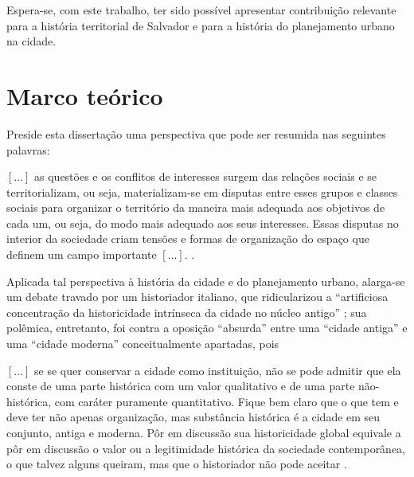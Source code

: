 Espera-se, com este trabalho, ter sido possível apresentar contribuição relevante para a história territorial de Salvador e para a história do planejamento urbano na cidade.

\section[Marco teórico]{Marco teórico}\label{sec:marcteor}

Preside esta dissertação uma perspectiva que pode ser resumida nas seguintes palavras:

\begin{citacao}
\([\dots]\) as questões e os conflitos de interesses surgem das relações sociais e se territorializam, ou seja, materializam-se em disputas entre esses grupos e classes sociais para organizar o território da maneira mais adequada aos objetivos de cada um, ou seja, do modo mais adequado aos seus interesses. Essas disputas no interior da sociedade criam tensões e formas de organização do espaço que definem um campo importante \([\dots]\). \cite[p.~41]{CASTRO2005}.
\end{citacao}

Aplicada tal perspectiva à história da cidade e do planejamento urbano, alarga-se um debate travado por um historiador italiano, que ridicularizou a ``artificiosa concentração da historicidade intrínseca da cidade no núcleo antigo'' \cite[p.~74]{argan_histcid_1992}; sua polêmica, entretanto, foi contra a oposição ``absurda'' entre uma ``cidade antiga'' e uma ``cidade moderna'' conceitualmente apartadas, pois 

\begin{citacao}
\([\dots]\) se se quer conservar a cidade como instituição, não se pode admitir que ela conste de uma parte histórica com um valor qualitativo e de uma parte não-histórica, com caráter puramente quantitativo. Fique bem claro que o que tem e deve ter não apenas organização, mas substância histórica é a cidade em seu conjunto, antiga e moderna. Pôr em discussão sua historicidade global equivale a pôr em discussão o valor ou a legitimidade histórica da sociedade contemporânea, o que talvez alguns queiram, mas que o historiador não pode aceitar \cite[p.~79]{argan_histcid_1992}.
\end{citacao}

